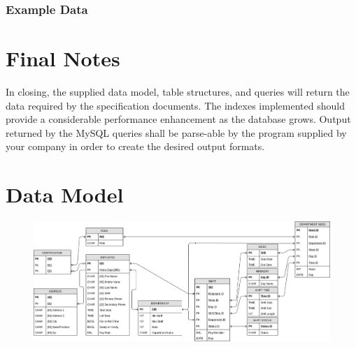 \documentclass[letter,12pt]{texMemo}
\begin{document}
\subsubsection*{Example Data}
\lstset{style=smallstyle}
	\begin{center}
		
	\end{center}
\lstset{style=smallstyle}

\section*{Final Notes}
In closing, the supplied data model, table structures, and queries will return the data required by the specification documents. The indexes implemented should provide a considerable performance enhancement as the database grows. Output returned by the MySQL queries shall be parse-able by the program supplied by your company in order to create the desired output formats.

\newpage
\section*{Data Model}
\begin{figure}[H]
	\centering
	\includegraphics[angle=90, height=\textheight]{er_diag.png}
\end{figure}



%
%
\end{document}
